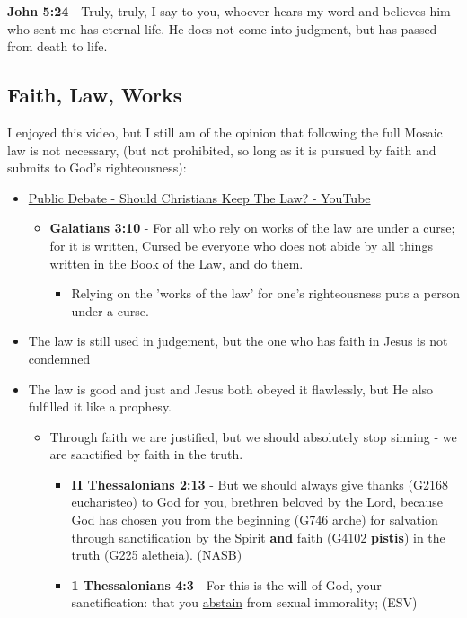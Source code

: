 \documentclass[11pt]{article}
\begin{document}
\textbf{John 5:24} - Truly, truly, I say to you, whoever hears my word and believes him who sent me has eternal life. He does not come into judgment, but has passed from death to life.

\subsection{Faith, Law, Works}
\label{sec:orgeb4daa5}
I enjoyed this video, but I still am of the opinion that following the full Mosaic law is not necessary, (but not prohibited, so long as it is pursued by faith and submits to God's righteousness):
\begin{itemize}
\item \href{https://www.youtube.com/watch?v=CNHKqhwu6Bo}{Public Debate - Should Christians Keep The Law? - YouTube}
\begin{itemize}
\item \textbf{Galatians 3:10} - For all who rely on works of the law are under a curse; for it is written, Cursed be everyone who does not abide by all things written in the Book of the Law, and do them.
\begin{itemize}
\item Relying on the 'works of the law' for one's righteousness puts a person under a curse.
\end{itemize}
\end{itemize}
\item The law is still used in judgement, but the one who has faith in Jesus is not condemned
\item The law is good and just and Jesus both obeyed it flawlessly, but He also fulfilled it like a prophesy.
\begin{itemize}
\item Through faith we are justified, but we should absolutely stop sinning - we are sanctified by faith in the truth.
\begin{itemize}
\item \textbf{II Thessalonians 2:13} - But we should always give thanks (G2168 eucharisteo) to God for you, brethren beloved by the Lord, because God has chosen you from the beginning (G746 arche) for salvation through sanctification by the Spirit \textbf{and} faith (G4102 \textbf{pistis}) in the truth (G225 aletheia). (NASB)
\item \textbf{1 Thessalonians 4:3} -  For this is the will of God, your sanctification: that you \uline{abstain} from sexual immorality;  (ESV)
\begin{itemize}

\end{itemize}
\end{itemize}
\end{itemize}
\end{itemize}
\end{document}
